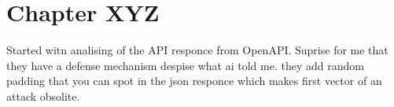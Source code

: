 \chapter{Chapter XYZ}
\label{latexchapter}

Started witn analising of the API responce from OpenAPI. Suprise for me that they have a defense mechanism despise what ai told me. they add random padding that you can spot in the json responce which makes first vector of an attack obsolite.